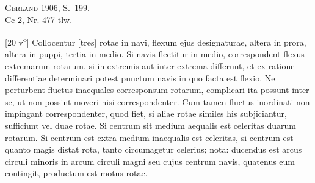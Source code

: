                             \begin{ledgroupsized}[r]{114mm}
                            \footnotesize 
                            \pstart \parindent -6mm
                            \cite{00243}\textsc{Gerland} 1906, S.~199.\\Cc 2, Nr. 477 tlw. \pend
                            \end{ledgroupsized}
                \vspace*{8mm}
                \pstart 
                \normalsize
            [20 v\textsuperscript{o}] Collocentur [tres] rotae\protect{} in navi\protect{}, flexum ejus designaturae, altera  in prora, altera in puppi, tertia in medio. Si navis\protect{} flectitur in medio, correspondent flexus  extremarum rotarum, si in extremis aut inter extrema differunt,  et ex ratione differentiae determinari potest punctum navis\protect{} in quo  facta est flexio. Ne perturbent fluctus inaequales  corresponsum rotarum\protect{}, complicari ita possunt inter se,  ut non possint moveri nisi correspondenter. Cum tamen fluctus inordinati non impingant correspondenter, quod fiet, si aliae rotae\protect{} similes his subjiciantur, sufficiunt vel duae rotae\protect{}.   Si centrum sit medium aequalis est celeritas\protect{} duarum rotarum\protect{}.  Si centrum est extra medium inaequalis est celeritas\protect{}, si centrum est  quanto magis distat rota\protect{},  tanto circumagetur celerius; nota: ducendus est arcus circuli minoris  in arcum circuli magni seu cujus centrum navis\protect{}, quatenus eum contingit, productum est motus rotae\protect{}.  \pend

